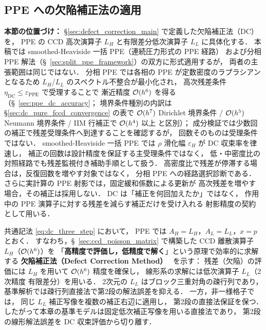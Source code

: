 %

\subsection{PPE への欠陥補正法の適用}
\label{sec:defect_correction_ppe}

\noindent\textbf{本節の位置づけ：}
§\ref{sec:defect_correction_main} で定義した欠陥補正法（DC）を，
PPE の CCD 高次演算子 $L_H$ と有限差分低次演算子 $L_L$ に具体化する．
本稿では smoothed-Heaviside 一括 PPE（連続圧力形式の PPE 経路）
および分相 PPE 解法（§~\ref{sec:split_ppe_framework}）の双方に形式適用するが，
両者の主張範囲は同じではない．
分相 PPE では各相の PPE が定数密度のラプラシアンとなるため
$L_H$/$L_L$ のスペクトル不整合が最小化され，
高次残差条件 $\eta_{\mathrm{DC}}\le\varepsilon_{\mathrm{PPE}}$ で受理することで
漸近精度 $\mathcal{O}(h^6)$ を得る（§~\ref{sec:ppe_dc_accuracy}；
境界条件種別の内訳は §\ref{sec:dc_pure_fccd_convergence} の表で
$\mathcal{O}(h^7)$ Dirichlet 境界条件 / $\mathcal{O}(h^5)$ Neumann 境界条件 / IIM 行補正で $\mathcal{O}(h^4)$ 以上 と区別）；
成分検証では少数回の補正で残差受理条件へ到達することを確認するが，
回数そのものは受理条件ではない．
smoothed-Heaviside 一括 PPE では $\rho$ 滑化幅
$\varepsilon_H$ が DC 収束率を律速し，
補正の回数は設計精度を保証する主受理条件ではなく，
低・中密度比の対照経路でも残差監視付き補助手順として扱う．
高密度比で残差が停滞する場合は，反復回数を増やす対象ではなく，
分相 PPE への経路選択診断である．
さらに実計算の PPE 射影では，固定緩和係数による更新が
高次残差を増やす場合，その補正は採用しない．
DC は「補正を何回加えたか」ではなく，
作用中の PPE 演算子に対する残差を減らす補正だけを受け入れる
射影精度の契約として用いる．

共通記法 \eqref{eq:dc_three_step} において，
PPE では $A_H=L_H$，$A_L=L_L$，$x=p$ とおく．
すなわち，§~\ref{sec:ccd_poisson_matrix} で構築した CCD 離散演算子 $L_H$（$\mathcal{O}(h^6)$）を
「\textbf{高精度で評価し，低精度で解く}」という原理で効率的に求解する
\textbf{欠陥補正法（Defect Correction Method）}~\cite{Stetter1978} を示す：
残差（欠陥）の評価には $L_H$ を用いて $\mathcal{O}(h^6)$ 精度を確保し，
線形系の求解には低次演算子 $L_L$（2次精度 有限差分）を用いる．
2次元の $L_L$ はブロック三重対角の疎行列であり，
基準解析では疎行列直接法で第2段の解法誤差を抑える．
一方，非一様格子では，
同じ $L_L$ 補正写像を複数の補正右辺に適用し，
第2段の直接法保証を保つ．
したがって本章の基準モデルは固定低次補正写像を用いる直接法であり，
第2段の線形解法誤差を DC 収束評価から切り離す．

